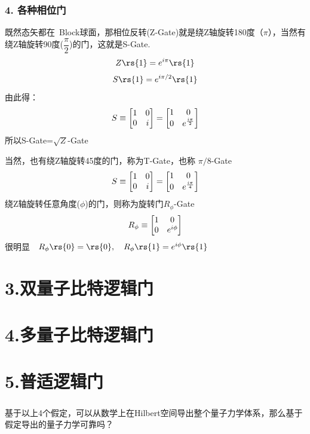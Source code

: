 \begin{frame}
    \frametitle{4. 各种相位门} 
    既然态矢都在 Block球面，那相位反转(Z-Gate)就是绕Z轴旋转180度（$\pi$），当然有绕Z轴旋转90度($\dfrac{\pi}{2}$)的门，这就是S-Gate.\\
    \[Z\rs{1}= e^{i\pi}\rs{1}\]
    \[S\rs{1}= e^{i\pi/2}\rs{1}\]
    由此得：\\
    \[S \equiv \begin{bmatrix} 1 & 0 \\ 0 & i \end{bmatrix} = {\begin{bmatrix}
        1 & 0 \\
        0 & e^{\frac{i\pi}{2}}
     \end{bmatrix}}\]
    所以S-Gate=$\sqrt{Z}$-Gate 
\end{frame}
    
\begin{frame}
    当然，也有绕Z轴旋转45度的门，称为T-Gate，也称 $\pi/8$-Gate
    \[S \equiv \begin{bmatrix} 1 & 0 \\ 0 & i \end{bmatrix} = {\begin{bmatrix}
        1 & 0 \\
        0 & e^{\frac{i\pi}{4}}
     \end{bmatrix}}\]
    绕Z轴旋转任意角度($\phi$)的门，则称为旋转门$R_\phi$-Gate
    \[R_\phi \equiv  \begin{bmatrix} 1 & 0 \\ 0 & e^{i\phi} \end{bmatrix} \]
    {\Bullet} 很明显~~$ R_\phi\rs{0}=\rs{0},\quad R_\phi\rs{1}= e^{i\phi}\rs{1}$
\end{frame}

\section{3.双量子比特逻辑门}

\section{4.多量子比特逻辑门}

\section{5.普适逻辑门}

\begin{frame}
    \frametitle{}
    \begin{tcolorbox3}[学术讨论]
        基于以上4个假定，可以从数学上在Hilbert空间导出整个量子力学体系，那么基于假定导出的量子力学可靠吗？
    \end{tcolorbox3}
\end{frame}